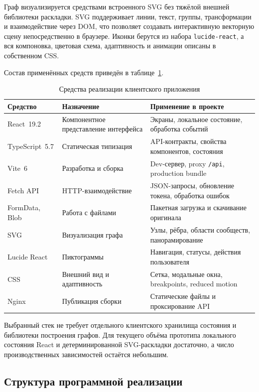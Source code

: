 Граф визуализируется средствами встроенного SVG без тяжёлой внешней библиотеки раскладки. SVG поддерживает линии, текст, группы, трансформации и взаимодействие через DOM, что позволяет создавать интерактивную векторную сцену непосредственно в браузере. \cite{SVGMDN2026} Иконки берутся из набора \texttt{lucide-react}, а вся компоновка, цветовая схема, адаптивность и анимации описаны в собственном CSS.

Состав применённых средств приведён в таблице~\ref{tab:frontend_technologies}.

\begin{table}[h!]
\caption{Средства реализации клиентского приложения}
\label{tab:frontend_technologies}
\begin{tabularx}{\textwidth}{|X|X|X|}
\hline
\textbf{Средство} & \textbf{Назначение} & \textbf{Применение в проекте} \\
\hline
React~19.2 & Компонентное представление интерфейса & Экраны, локальное состояние, обработка событий \\
\hline
TypeScript~5.7 & Статическая типизация & API-контракты, свойства компонентов, состояния \\
\hline
Vite~6 & Разработка и сборка & Dev-сервер, proxy \texttt{/api}, production bundle \\
\hline
Fetch API & HTTP-взаимодействие & JSON-запросы, обновление токена, обработка ошибок \\
\hline
FormData, Blob & Работа с файлами & Пакетная загрузка и скачивание оригинала \\
\hline
SVG & Визуализация графа & Узлы, рёбра, области сообществ, панорамирование \\
\hline
Lucide React & Пиктограммы & Навигация, статусы, действия пользователя \\
\hline
CSS & Внешний вид и адаптивность & Сетка, модальные окна, breakpoints, reduced motion \\
\hline
Nginx & Публикация сборки & Статические файлы и проксирование API \\
\hline
\end{tabularx}
\end{table}

Выбранный стек не требует отдельного клиентского хранилища состояния и библиотеки построения графов. Для текущего объёма прототипа локального состояния React и детерминированной SVG-раскладки достаточно, а число производственных зависимостей остаётся небольшим.

\subsection{Структура программной реализации}

